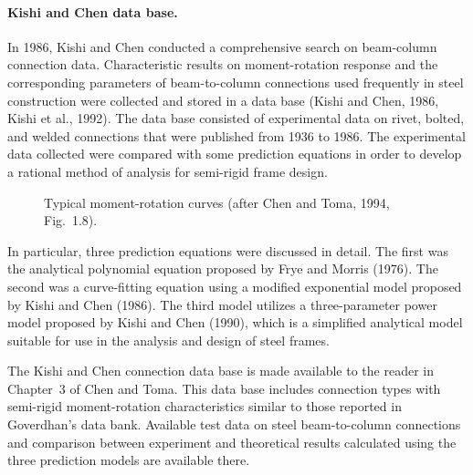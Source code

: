 \paragraph{Kishi and Chen data base.} In 1986, Kishi and Chen conducted a comprehensive search on beam-column connection data. Characteristic results on moment-rotation response and the corresponding parameters of beam-to-column connections used frequently in steel construction were collected and stored in a data base (Kishi and Chen, 1986, Kishi et al., 1992). The data base consisted of experimental data on rivet, bolted, and welded connections that were published from 1936 to 1986. The experimental data collected were compared with some prediction equations in order to develop a rational method of analysis for semi-rigid frame design.
\begin{figure}[H]
  \centering
  
  \caption{Typical moment-rotation curves (after Chen and Toma, 1994, Fig.~1.8).}
\end{figure}
In particular, three prediction equations were discussed in detail. The first was the analytical polynomial equation proposed by Frye and Morris (1976). The second was a curve-fitting equation using a modified exponential model proposed by Kishi and Chen (1986). The third model utilizes a three-parameter power model proposed by Kishi and Chen (1990), which is a simplified analytical model suitable for use in the analysis and design of steel frames.

The Kishi and Chen connection data base is made available to the reader in Chapter~3 of Chen and Toma. This data base includes connection types with semi-rigid moment-rotation characteristics similar to those reported in Goverdhan's data bank. Available test data on steel beam-to-column connections and comparison between experiment and theoretical results calculated using the three prediction models are available there.

